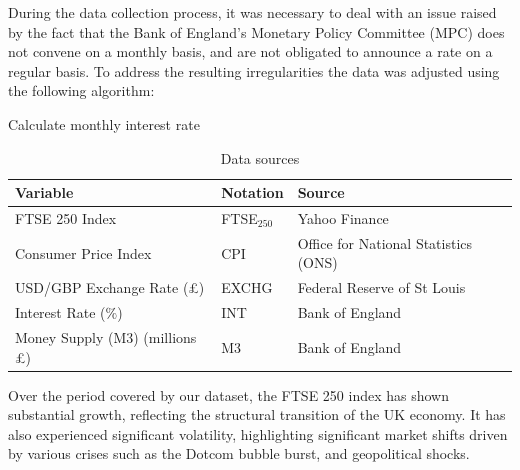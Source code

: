 \documentclass[11pt,a4paper]{article}
\begin{document}
During the data collection process, it was necessary to deal with an issue raised by the fact that the Bank of England’s Monetary Policy Committee (MPC) 
does not convene on a monthly basis, and are not obligated to 
announce a rate on a regular basis. To address the resulting irregularities the data was adjusted using the following algorithm:

\begin{algorithm}[H]
    \caption{Calculate monthly interest rate}
    \label{alg:interest_rate_adjustment}
    
\end{algorithm}


\begin{table}[h!]
    \centering
    \caption{Data sources}
    \begin{tabular}{lll}
        \toprule
        \textbf{Variable} & \textbf{Notation} & \textbf{Source} \\
        \midrule
        FTSE 250 Index & FTSE$_{250}$ & Yahoo Finance \\
        Consumer Price Index & CPI & Office for National Statistics (ONS) \\
        USD/GBP Exchange Rate (£) & EXCHG & Federal Reserve of St Louis \\
        Interest Rate ($\%$) & INT & Bank of England \\
        Money Supply (M3) (millions £) & M3 & Bank of England \\
        \bottomrule
    \end{tabular}
\end{table}

Over the period covered by our dataset, the FTSE 250 index has 
shown substantial growth, reflecting the structural transition of the UK economy.
It has also experienced significant volatility, highlighting significant market shifts driven by 
various crises such as the Dotcom bubble burst, and geopolitical shocks.
\end{document}
